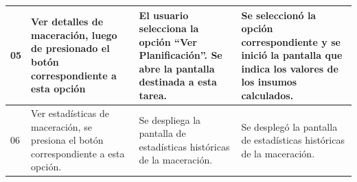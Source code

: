 \begin{longtable}{|p{0.6cm}|p{4cm}|p{4.7cm}|p{4.7cm}|}
    05 & Ver detalles de maceración, luego de presionado el botón correspondiente a esta opción & El usuario selecciona la opción ``Ver Planificación''. Se abre la pantalla destinada a esta tarea.& Se seleccionó la opción correspondiente y se inició la pantalla que indica los valores de los insumos calculados.\\
    \hline
    06 & Ver estadísticas de maceración, se presiona el botón correspondiente a esta opción. & Se despliega la pantalla de estadísticas históricas de  la maceración.& Se desplegó la pantalla de estadísticas históricas de  la maceración.\\
    \hline
 \end{longtable}



